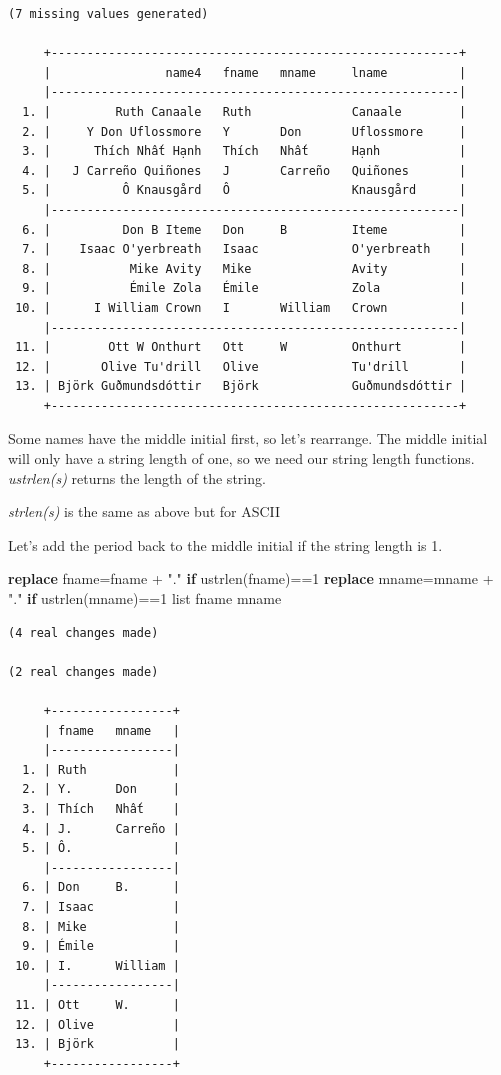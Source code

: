 \documentclass[
]{book}
\newenvironment{Shaded}{\begin{snugshade}}{\end{snugshade}}
\newcommand{\KeywordTok}[1]{\textcolor[rgb]{0.13,0.29,0.53}{\textbf{#1}}}
\newcommand{\NormalTok}[1]{#1}
\newcommand{\OtherTok}[1]{\textcolor[rgb]{0.56,0.35,0.01}{#1}}
\newcommand{\StringTok}[1]{\textcolor[rgb]{0.31,0.60,0.02}{#1}}
\begin{document}
\begin{verbatim}
(7 missing values generated)

     +---------------------------------------------------------+
     |                name4   fname   mname     lname          |
     |---------------------------------------------------------|
  1. |         Ruth Canaale   Ruth              Canaale        |
  2. |     Y Don Uflossmore   Y       Don       Uflossmore     |
  3. |      Thích Nhất Hạnh   Thích   Nhất      Hạnh           |
  4. |   J Carreño Quiñones   J       Carreño   Quiñones       |
  5. |          Ô Knausgård   Ô                 Knausgård      |
     |---------------------------------------------------------|
  6. |          Don B Iteme   Don     B         Iteme          |
  7. |    Isaac O'yerbreath   Isaac             O'yerbreath    |
  8. |           Mike Avity   Mike              Avity          |
  9. |           Émile Zola   Émile             Zola           |
 10. |      I William Crown   I       William   Crown          |
     |---------------------------------------------------------|
 11. |        Ott W Onthurt   Ott     W         Onthurt        |
 12. |       Olive Tu'drill   Olive             Tu'drill       |
 13. | Björk Guðmundsdóttir   Björk             Guðmundsdóttir |
     +---------------------------------------------------------+
\end{verbatim}

Some names have the middle initial first, so let's rearrange. The middle initial will only have a string length of one, so we need our string length functions.
\emph{ustrlen(s)} returns the length of the string.

\emph{strlen(s)} is the same as above but for ASCII

Let's add the period back to the middle initial if the string length is 1.

\begin{Shaded}
\begin{Highlighting}[]
\KeywordTok{replace}\NormalTok{ fname=fname + }\StringTok{"."} \KeywordTok{if}\NormalTok{ ustrlen(fname)==1}
\KeywordTok{replace}\NormalTok{ mname=mname + }\StringTok{"."} \KeywordTok{if}\NormalTok{ ustrlen(mname)==1}
\OtherTok{list}\NormalTok{ fname mname}
\end{Highlighting}
\end{Shaded}

\begin{verbatim}
(4 real changes made)

(2 real changes made)

     +-----------------+
     | fname   mname   |
     |-----------------|
  1. | Ruth            |
  2. | Y.      Don     |
  3. | Thích   Nhất    |
  4. | J.      Carreño |
  5. | Ô.              |
     |-----------------|
  6. | Don     B.      |
  7. | Isaac           |
  8. | Mike            |
  9. | Émile           |
 10. | I.      William |
     |-----------------|
 11. | Ott     W.      |
 12. | Olive           |
 13. | Björk           |
     +-----------------+
\end{verbatim}
\end{document}
